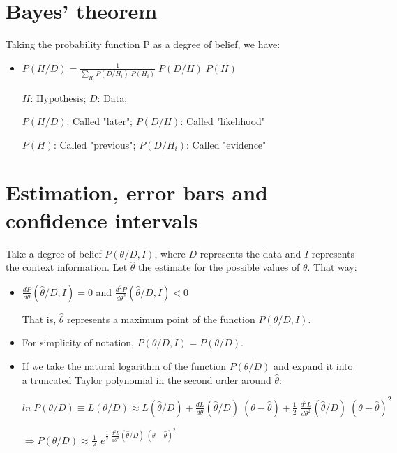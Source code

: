 \documentclass{article}
\begin{document}
\section{Bayes' theorem}

Taking the probability function P as a degree of belief, we have:

\begin{itemize}

\item $P(H/D) = \frac{1}{\sum\limits_{H_{i}} P(D/H_{i}) \; P(H_{i})} \; P(D/H) \; P(H)$

$H$: Hypothesis; $D$: Data;

$P(H/D)$: Called "later"; $P(D/H)$: Called "likelihood"

$P(H)$: Called "previous"; $P(D/H_{i})$: Called "evidence"

\end{itemize}

\section{Estimation, error bars and confidence intervals}

Take a degree of belief $P(\theta/D,I)$, where $D$ represents the data and $I$ represents the context information. Let $\hat{\theta}$ the estimate for the possible values of $\theta$. That way:

\begin{itemize}

\item $\frac{dP}{d\theta} (\hat{\theta}/D,I) = 0$ and $\frac{d^{2}P}{d\theta^{2}} (\hat{\theta}/D,I) < 0$

That is, $\hat{\theta}$ represents a maximum point of the function $P(\theta/D,I)$.

\item For simplicity of notation, $P(\theta/D,I) = P(\theta/D)$.

\item If we take the natural logarithm of the function $P(\theta/D)$ and expand it into a truncated Taylor polynomial in the second order around $\hat{\theta}$:

$ln \; P(\theta/D) \equiv L(\theta/D) \approx L(\hat{\theta}/D) + \frac{dL}{d\theta} (\hat{\theta}/D) \; (\theta - \hat{\theta}) + \frac{1}{2} \; \frac{d^{2}L}{d\theta^{2}} (\hat{\theta}/D) \; (\theta - \hat{\theta})^{2}$

$\Rightarrow P(\theta/D) \approx \frac{1}{A} \; e^{\frac{1}{2} \; \frac{d^{2}L}{d\theta^{2}} (\hat{\theta}/D) \; (\theta - \hat{\theta})^{2}}$

\end{itemize}
\end{document}

